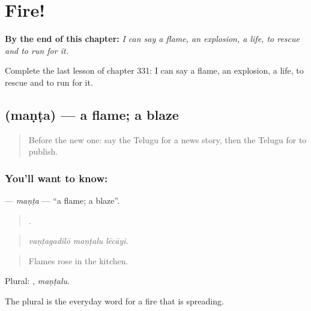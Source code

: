 
\chapter{Fire!}
\label{ch:te-fire}

\begin{chapteropening}
\textbf{By the end of this chapter:} \emph{I can say a flame, an explosion, a life, to rescue and to run for it.}

Complete the last lesson of chapter 331: I can say a flame, an explosion, a life, to rescue and to run for it.
\end{chapteropening}

\section[\texorpdfstring{\te{మంట} (maṇṭa)}{మంట (maṇṭa)}]{ (maṇṭa) — a flame; a blaze}

\label{lesson:TE-C331-manta}



\begin{quote}
Before the new one: say the Telugu for a news story, then the Telugu for to publish.
\end{quote}

\subsection*{You'll want to know: }
\textbf{} — \emph{maṇṭa} — \textquotedblleft{}a flame; a blaze\textquotedblright{}.

\begin{quote}
  .
\end{quote}

\begin{quote}
\emph{vaṇṭagadilō maṇṭalu lēcāyi.}
\end{quote}

\begin{quote}
Flames rose in the kitchen.
\end{quote}

Plural: , \emph{maṇṭalu}.

The plural  is the everyday word for a fire that is spreading.

